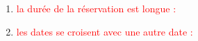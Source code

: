 \documentclass{article}
\begin{document}
\begin{enumerate}
\begin{enumerate}
               \noindent{}
  \item \textcolor{red}{la durée de la réservation est longue :} 
  \vspace{0.7cm}
               \hspace*{-0.7in}

               \noindent{}
  \item \textcolor{red}{les dates se croisent avec une autre date :} 
  \vspace{0.7cm}
               \hspace*{-0.7in}


\end{enumerate}
\end{enumerate}
\end{document}
